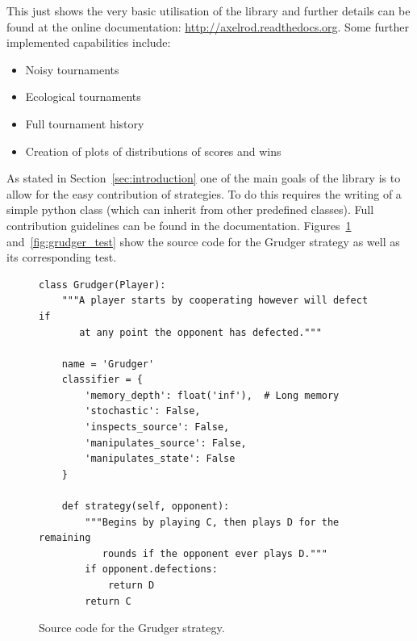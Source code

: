\documentclass{article}
\begin{document}
This just shows the very basic utilisation of the library and further details
can be found at the online documentation:
\url{http://axelrod.readthedocs.org}. Some further implemented capabilities include:

\begin{itemize}
    \item Noisy tournaments
    \item Ecological tournaments
    \item Full tournament history
    \item Creation of plots of distributions of scores and wins
\end{itemize}

As stated in Section~\ref{sec:introduction} one of the main goals of the library
is to allow for the easy contribution of strategies. To do this requires the
writing of a simple python class (which can inherit from other predefined
classes). Full contribution guidelines can be found in the documentation.
Figures~\ref{fig:grudger} and~\ref{fig:grudger_test} show the source code for
the Grudger strategy as well as its corresponding test.

\begin{figure}[!hbtp]
    \begin{lstlisting}[frame=single]
class Grudger(Player):
    """A player starts by cooperating however will defect if
       at any point the opponent has defected."""

    name = 'Grudger'
    classifier = {
        'memory_depth': float('inf'),  # Long memory
        'stochastic': False,
        'inspects_source': False,
        'manipulates_source': False,
        'manipulates_state': False
    }

    def strategy(self, opponent):
        """Begins by playing C, then plays D for the remaining
           rounds if the opponent ever plays D."""
        if opponent.defections:
            return D
        return C
    \end{lstlisting}
    \caption{Source code for the Grudger strategy.}
    \label{fig:grudger}
\end{figure}
\end{document}
